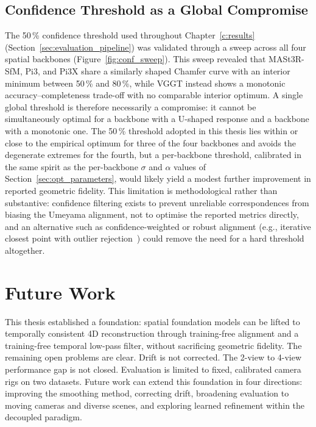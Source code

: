 \subsection{Confidence Threshold as a Global Compromise}
The 50\,\% confidence threshold used throughout Chapter~\ref{c:results}
(Section~\ref{sec:evaluation_pipeline}) was validated through a sweep
across all four spatial backbones (Figure~\ref{fig:conf_sweep}). This sweep
revealed that MASt3R-SfM, Pi3, and Pi3X share a similarly shaped Chamfer curve
with an interior minimum between 50\,\% and 80\,\%, while VGGT instead shows a
monotonic accuracy--completeness trade-off with no comparable interior optimum.
A single global threshold is therefore necessarily a compromise: it cannot be
simultaneously optimal for a backbone with a U-shaped response and a backbone
with a monotonic one. The 50\,\% threshold adopted in this thesis lies within
or close to the empirical optimum for three of the four backbones and avoids
the degenerate extremes for the fourth, but a per-backbone threshold, calibrated
in the same spirit as the per-backbone $\sigma$ and $\alpha$ values of
Section~\ref{sec:opt_parameters}, would likely yield a modest further
improvement in reported geometric fidelity. This limitation is methodological
rather than substantive: confidence filtering exists to prevent unreliable
correspondences from biasing the Umeyama alignment, not to optimise the
reported metrics directly, and an alternative such as confidence-weighted or
robust alignment (e.g., iterative closest point with outlier rejection~\cite{121791})
could remove the need for a hard threshold altogether.

\section{Future Work}
\label{sec:future_work}

This thesis established a foundation: spatial foundation models can be lifted to
temporally consistent 4D reconstruction through training-free alignment and a
training-free temporal low-pass filter, without sacrificing geometric fidelity. The
remaining open problems are clear. Drift is not corrected. The 2-view to 4-view
performance gap is not closed. Evaluation is limited to fixed, calibrated camera rigs
on two datasets. Future work can extend this foundation in four directions: improving
the smoothing method, correcting drift, broadening evaluation to moving cameras
and diverse scenes, and exploring learned refinement within the decoupled paradigm.

